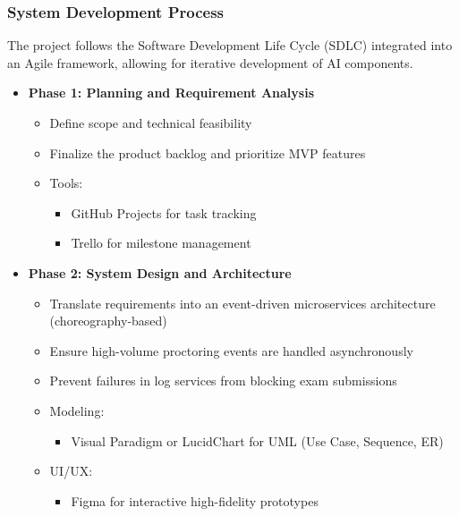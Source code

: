 \subsubsection{System Development Process}
The project follows the Software Development Life Cycle (SDLC) integrated into an Agile framework, allowing for iterative development of AI components.

\begin{itemize}[leftmargin=1.4em]
    \item \textbf{Phase 1: Planning and Requirement Analysis}
    \begin{itemize}
        \item Define scope and technical feasibility
        \item Finalize the product backlog and prioritize MVP features
        \item Tools: 
        \begin{itemize}
            \item GitHub Projects for task tracking
            \item Trello for milestone management
        \end{itemize}
    \end{itemize}
    
    \item \textbf{Phase 2: System Design and Architecture}
    \begin{itemize}
        \item Translate requirements into an event-driven microservices architecture (choreography-based)
        \item Ensure high-volume proctoring events are handled asynchronously
        \item Prevent failures in log services from blocking exam submissions
        \item Modeling:
        \begin{itemize}
            \item Visual Paradigm or LucidChart for UML (Use Case, Sequence, ER)
        \end{itemize}
        \item UI/UX:
        \begin{itemize}
            \item Figma for interactive high-fidelity prototypes
        \end{itemize}
    \end{itemize}
    

\end{itemize}
